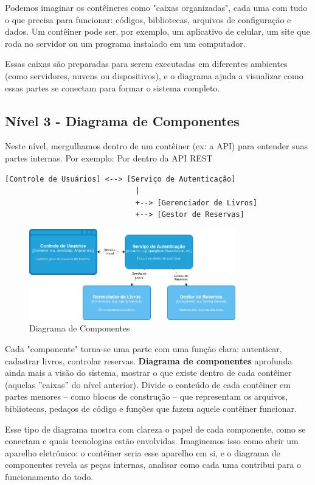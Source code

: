 \documentclass[a4paper,11pt]{article}
\begin{document}
Podemos imaginar os contêineres como "caixas organizadas", cada uma com tudo o que precisa
para funcionar: códigos, bibliotecas, arquivos de configuração e dados. Um contêiner pode ser, por exemplo, um aplicativo de celular, um site que roda no servidor ou um programa instalado em um computador.

Essas caixas são preparadas para serem executadas em diferentes ambientes (como servidores, nuvens ou dispositivos), e o diagrama ajuda a visualizar como essas partes se conectam para formar o sistema completo.

\subsection{Nível 3 - Diagrama de Componentes}
Neste nível, mergulhamos dentro de um contêiner (ex: a API) para entender suas partes internas.
Por exemplo: Por dentro da API REST \vspace{-1em}
\begin{verbatim}
[Controle de Usuários] <--> [Serviço de Autenticação]
                              |
                              +--> [Gerenciador de Livros]
                              +--> [Gestor de Reservas]
\end{verbatim}

\begin{figure}[!htb]
	\centering
	\includegraphics[width=0.8\textwidth]{imagens/Componentes}
	\caption{Diagrama de Componentes}
\end{figure}

Cada "componente" torna-se uma parte com uma função clara: autenticar, cadastrar livros, controlar reservas. \textbf{Diagrama de componentes} aprofunda ainda mais a visão do sistema, mostrar o que existe dentro de cada contêiner (aquelas ”caixas” do nível anterior). Divide o conteúdo de cada contêiner em partes menores – como blocos de construção – que representam os arquivos, bibliotecas, pedaços de código e funções que fazem aquele contêiner funcionar.

Esse tipo de diagrama mostra com clareza o papel de cada componente, como se conectam e quais
tecnologias estão envolvidas. Imaginemos isso como abrir um aparelho eletrônico: o contêiner seria esse aparelho em si, e o diagrama de componentes revela as peças internas, analisar como cada uma contribui para o funcionamento do todo.
\end{document}
